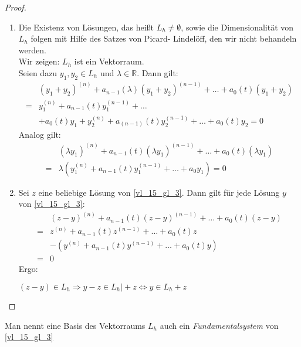 \begin{proof}
	\begin{enumerate}
		\item Die Existenz von Lösungen, das heißt $L_h \neq \emptyset$, sowie 
		die Dimensionalität von $L_h$ folgen mit Hilfe des Satzes von Picard-
		Lindelöff, den wir nicht behandeln werden.\\
		Wir zeigen: $L_h$ ist ein Vektorraum.\\
		Seien dazu $y_1,y_2 \in L_h$ und $\lambda \in \mathbb{R}$.
		Dann gilt:
		\begin{align*}
			& (y_1 + y_2)^{(n)} + a_{n-1}(\lambda)(y_1+y_2)^{(n-1)} + \hdots 	
			+ a_0(t)(y_1 + y_2) \\
			= & y_1^{(n)} + a_{n-1}(t)y_{1}^{(n-1)}+ \hdots \\
			& + a_0(t)y_1 + y_2^{(n)} + a_{(n-1)}(t)y_{2}^{(n-1)} + \hdots + 
			a_0(t)y_2 = 0		
		\end{align*}
		Analog gilt:
		\begin{align*}
			& (\lambda y_1)^{(n)} + a_{n-1}(t)(\lambda y_1)^{(n-1)} + \hdots 
			+ a_0(t)(\lambda y_1) \\ =
			& \lambda(y_1^{(n)}+a_{n-1}(t)y_1^{(n-1)} + \hdots + a_0 y_1) = 0
		\end{align*}
		\item Sei $z$ eine beliebige Lösung von \ref{vl_15_gl_3}. Dann gilt für jede Lösung 
		$y$ von \ref{vl_15_gl_3}:
		\begin{align*}
			& (z-y)^{(n)} + a_{n-1}(t) (z-y)^{(n-1)}+\hdots+a_0(t)(z-y) \\
			= & z^{(n)} + a_{n-1}(t)z^{(n-1)} + \hdots +a_0(t)z \\
			& -\left( y^{(n)} + a_{n-1}(t)y^{(n-1)} + \hdots + a_0(t)y\right) \\
			= & 0
		\end{align*}
		Ergo:
		\begin{center}
		 $(z-y) \in L_h\Rightarrow y-z \in L_h \vert + z \Leftrightarrow y \in L_h + z$
		\end{center}
	\end{enumerate}
\end{proof}

\begin{Definition}{\label{vl_16_def_1}
	Man nennt eine Basis des Vektorraums $L_h$ auch ein \emph{Fundamentalsystem} von 
	\ref{vl_15_gl_3}
}\end{Definition}

